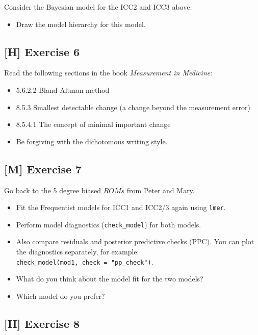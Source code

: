 \documentclass[
]{book}
\providecommand{\tightlist}{%
  \setlength{\itemsep}{0pt}\setlength{\parskip}{0pt}}
\begin{document}
Consider the Bayesian model for the ICC2 and ICC3 above.

\begin{itemize}
\tightlist
\item
  Draw the model hierarchy for this model.
\end{itemize}

\subsection{{[}H{]} Exercise 6}\label{exercise6}

Read the following sections in the book \emph{Measurement in Medicine}:

\begin{itemize}
\tightlist
\item
  5.6.2.2 Bland-Altman method
\item
  8.5.3 Smallest detectable change (a change beyond the measurement error)
\item
  8.5.4.1 The concept of minimal important change
\item
  Be forgiving with the dichotomous writing style.
\end{itemize}

\subsection{{[}M{]} Exercise 7}\label{exercise7}

Go back to the 5 degree biased \(ROMs\) from Peter and Mary.

\begin{itemize}
\tightlist
\item
  Fit the Frequentist models for ICC1 and ICC2/3 again using \texttt{lmer}.
\item
  Perform model diagnostics (\texttt{check\_model}) for both models.
\item
  Also compare residuals and posterior predictive checks (PPC). You can
  plot the diagnostics separately, for example: \texttt{check\_model(mod1,\ check\ =\ "pp\_check")}.
\item
  What do you think about the model fit for the two models?
\item
  Which model do you prefer?
\end{itemize}

\subsection{{[}H{]} Exercise 8}\label{exercise8}
\end{document}
